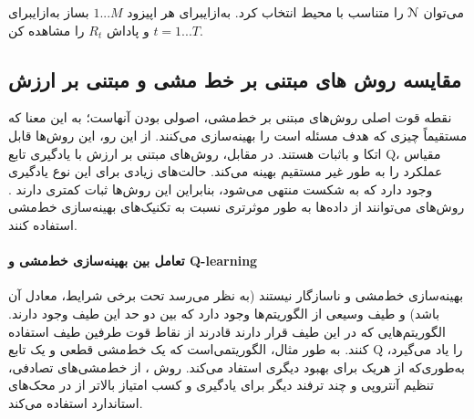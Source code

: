 می‌توان $\EuScript{N}$ 
را متناسب با محیط انتخاب کرد.
\‌به‌ازای{برای هر اپیزود $1...M$}
 بساز
\‌به‌ازای{برای $t=1...T$}
 و پاداش $R_t$ را مشاهده کن.

\subsection{مقایسه روش های مبتنی بر خط مشی و مبتنی بر ارزش}
نقطه قوت اصلی روش‌های مبتنی بر خط‌مشی، اصولی بودن آنهاست؛ به این معنا که مستقیماً چیزی که هدف مسئله است را بهینه‌سازی می‌کنند. از این رو، این روش‌ها قابل اتکا و باثبات هستند. در مقابل، روش‌های مبتنی بر ارزش
با یادگیری تابع Q، مقیاس عملکرد را به طور غیر مستقیم بهینه می‌کند. حالت‌های زیادی برای این نوع یادگیری وجود دارد که به شکست منتهی می‌شود، بنابراین این روش‌ها  ثبات کمتری دارند 
\cite{suttonbook}.
روش‌های 
 می‌توانند از داده‌ها به طور موثرتری نسبت به تکنیک‌های بهینه‌سازی خط‌مشی استفاده کنند.
\paragraph{تعامل بین بهینه‌سازی خط‌مشی و Q-learning}
 بهینه‌سازی خط‌مشی و  
ناسازگار نیستند (به نظر می‌رسد تحت برخی شرایط، معادل آن باشد) و طیف وسیعی از الگوریتم‌ها وجود دارد که بین دو حد این طیف وجود دارند. الگوریتم‌هایی که در این طیف قرار دارند قادرند از نقاط قوت  طرفین طیف استفاده کنند.
  به طور مثال، 
 الگوریتمی‌است که  یک خط‌مشی قطعی و یک تابع Q را یاد می‌گیرد،
 به‌طوری‌که از هریک  برای بهبود دیگری استفاد می‌کند. روش
 ،
   از خط‌مشی‌های تصادفی، تنظیم آنتروپی  و چند ترفند دیگر برای  یادگیری و کسب امتیاز بالاتر از 
    در محک‌های استاندارد
    استفاده می‌کند.

